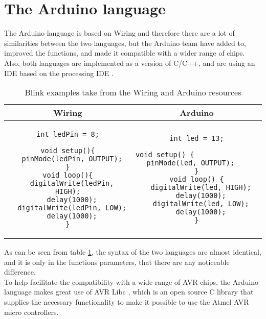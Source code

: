 \section{The Arduino language}
The Arduino language is based on Wiring and therefore there are a lot of similarities between the two languages, but the Arduino team have added to, improved the functions, and made it compatible with a wider range of chips. Also, both languages are implemented as a  version of C/C++, and are using an IDE based on the processing IDE \cite{Wiring:thesis}\cite{Arduino:IDE}.\\

\begin{table}[H]
\centering
\begin{tabular}{cc}
Wiring 
& 
Arduino \\ 
\hline 
\begin{lstlisting}
int ledPin = 8;

void setup(){
  pinMode(ledPin, OUTPUT);
}
void loop(){
  digitalWrite(ledPin, HIGH);
  delay(1000);
  digitalWrite(ledPin, LOW);
  delay(1000);
}
\end{lstlisting}  
& 
\begin{lstlisting}
int led = 13;

void setup() {                
  pinMode(led, OUTPUT);     
}
void loop() {
  digitalWrite(led, HIGH);
  delay(1000);
  digitalWrite(led, LOW);
  delay(1000);
}
\end{lstlisting} 
\end{tabular} 
\caption{Blink examples take from the Wiring and Arduino resources}
\label{tabel:comparison}
\end{table}

As can be seen from table \ref{tabel:comparison}, the syntax of the two languages are almost identical, and it is only in the functions parameters, that there are any noticeable difference.\\ 
To help facilitate the compatibility with a wide range of AVR chips, the Arduino language makes great use of AVR Libc \cite{AVR:lib}, which is an open source C library that supplies the necessary functionality to make it possible to use the Atmel AVR micro controllers.